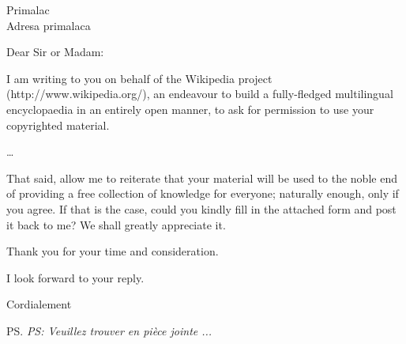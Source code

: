 \documentclass[a4paper]{letter}
\begin{document}
\begin{letter}{\sc Primalac\\Adresa primalaca}
\opening{Dear Sir or Madam:}

I am writing to you on behalf of the Wikipedia project (http://www.wikipedia.org/),
an endeavour to build a fully-fledged multilingual encyclopaedia in an entirely
open manner, to ask for permission to use your copyrighted material.

\ldots 

That said, allow me to reiterate that your material will be used to the noble end of
providing a free collection of knowledge for everyone; naturally enough, only if you
agree. If that is the case, could you kindly fill in the attached form and post it
back to me? We shall greatly appreciate it.

Thank you for your time and consideration.

I look forward to your reply.

\closing{Cordialement}

\ps{\it PS: Veuillez trouver en pièce jointe ...}


\end{letter}
\end{document}
